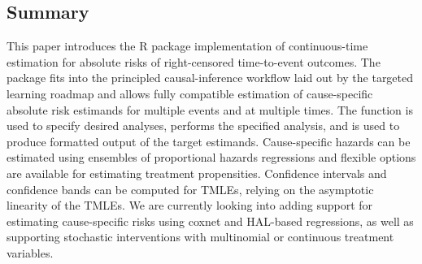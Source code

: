 \documentclass{report}
\newcommand{\1}{\ensuremath{\mathbf{1}}}
\begin{document}
\subsection{Summary}
\label{sec:org8343445}
This paper introduces the  R package implementation of continuous-time estimation for absolute risks of right-censored time-to-event outcomes. The package fits into the principled causal-inference workflow laid out by the targeted learning roadmap and allows fully compatible estimation of cause-specific absolute risk estimands for multiple events and at multiple times. The  function is used to specify desired analyses,  performs the specified analysis, and  is used to produce formatted output of the target estimands. Cause-specific hazards can be estimated using ensembles of proportional hazards regressions and flexible options are available for estimating treatment propensities. Confidence intervals and confidence bands can be computed for TMLEs, relying on the asymptotic linearity of the TMLEs. We are currently looking into adding support for estimating cause-specific risks using coxnet and HAL-based regressions, as well as supporting stochastic interventions with multinomial or continuous treatment variables. 


\newpage

\end{document}
